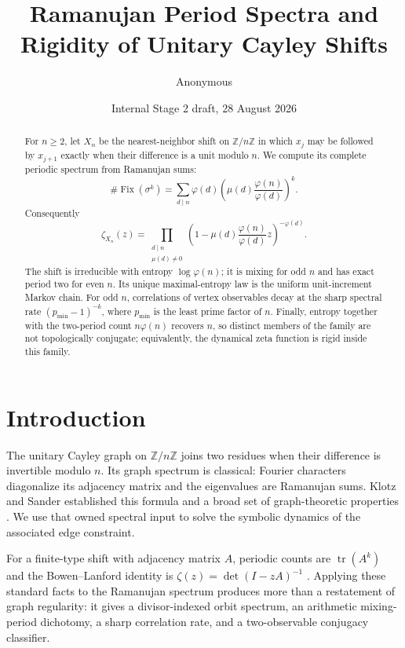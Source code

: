 \documentclass[11pt,a4paper]{amsart}
\title[Unitary Cayley shifts]{Ramanujan Period Spectra and Rigidity of Unitary Cayley Shifts}
\author{Anonymous}
\date{Internal Stage 2 draft, 28 August 2026}
\theoremstyle{definition}
\theoremstyle{remark}
\newcommand{\Z}{\mathbb Z}
\newcommand{\Fix}{\operatorname{Fix}}
\begin{document}
\begin{abstract}
For $n\geq2$, let $X_n$ be the nearest-neighbor shift on $\Z/n\Z$ in
which $x_j$ may be followed by $x_{j+1}$ exactly when their difference is a
unit modulo $n$.  We compute its complete periodic spectrum from Ramanujan
sums:
\[
 \#\Fix(\sigma^k)=
 \sum_{d\mid n}\varphi(d)
 \left(\mu(d)\frac{\varphi(n)}{\varphi(d)}\right)^k.
\]
Consequently
\[
 \zeta_{X_n}(z)=
 \prod_{\substack{d\mid n\\ \mu(d)\ne0}}
 \left(1-\mu(d)\frac{\varphi(n)}{\varphi(d)}z\right)^{-\varphi(d)}.
\]
The shift is irreducible with entropy $\log\varphi(n)$; it is mixing for odd
$n$ and has exact period two for even $n$.  Its unique maximal-entropy law is
the uniform unit-increment Markov chain.  For odd $n$, correlations of vertex
observables decay at the sharp spectral rate $(p_{\min}-1)^{-k}$, where
$p_{\min}$ is the least prime factor of $n$.  Finally, entropy together with
the two-period count $n\varphi(n)$ recovers $n$, so distinct members of the
family are not topologically conjugate; equivalently, the dynamical zeta
function is rigid inside this family.
\end{abstract}

\maketitle

\section{Introduction}

The unitary Cayley graph on $\Z/n\Z$ joins two residues when their difference
is invertible modulo $n$.  Its graph spectrum is classical: Fourier
characters diagonalize its adjacency matrix and the eigenvalues are
Ramanujan sums.  Klotz and Sander established this formula and a broad set of
graph-theoretic properties \cite{KlotzSander2007}.  We use that owned spectral
input to solve the symbolic dynamics of the associated edge constraint.

For a finite-type shift with adjacency matrix $A$, periodic counts are
$\operatorname{tr}(A^k)$ and the Bowen--Lanford identity is
$\zeta(z)=\det(I-zA)^{-1}$ \cite{BowenLanford1970}.  Applying these standard
facts to the Ramanujan spectrum produces more than a restatement of graph
regularity: it gives a divisor-indexed orbit spectrum, an arithmetic
mixing-period dichotomy, a sharp correlation rate, and a two-observable
conjugacy classifier.
\end{document}

